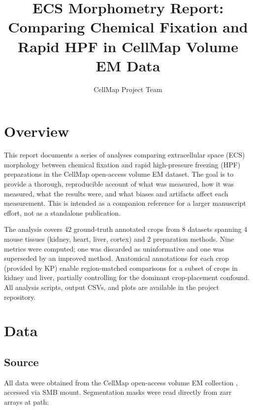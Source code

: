 \documentclass[times, twoside]{zHenriquesLab-StyleBioRxiv}
\begin{document}
\title{ECS Morphometry Report: Comparing Chemical Fixation and Rapid HPF in CellMap Volume EM Data}

\author[1]{CellMap Project Team}


\maketitle

\section*{Overview}

This report documents a series of analyses comparing extracellular space (ECS) morphology between chemical fixation and rapid high-pressure freezing (HPF) preparations in the CellMap open-access volume EM dataset. The goal is to provide a thorough, reproducible account of what was measured, how it was measured, what the results were, and what biases and artifacts affect each measurement. This is intended as a companion reference for a larger manuscript effort, not as a standalone publication.

The analysis covers 42 ground-truth annotated crops from 8 datasets spanning 4 mouse tissues (kidney, heart, liver, cortex) and 2 preparation methods. Nine metrics were computed; one was discarded as uninformative and one was superseded by an improved method. Anatomical annotations for each crop (provided by KP) enable region-matched comparisons for a subset of crops in kidney and liver, partially controlling for the dominant crop-placement confound. All analysis scripts, output CSVs, and plots are available in the project repository.

\section*{Data}

\subsection*{Source}
All data were obtained from the CellMap open-access volume EM collection \cite{Heinrich2021, Xu2021}, accessed via SMB mount. Segmentation masks were read directly from zarr arrays at path:
\end{document}
